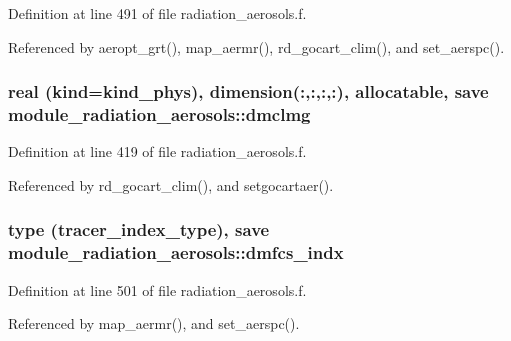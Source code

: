 Definition at line 491 of file radiation\+\_\+aerosols.\+f.



Referenced by aeropt\+\_\+grt(), map\+\_\+aermr(), rd\+\_\+gocart\+\_\+clim(), and set\+\_\+aerspc().

\subsubsection[{\texorpdfstring{dmclmg}{dmclmg}}]{\setlength{\rightskip}{0pt plus 5cm}real (kind=kind\+\_\+phys), dimension(\+:,\+:,\+:,\+:), allocatable, save module\+\_\+radiation\+\_\+aerosols\+::dmclmg\hspace{0.3cm}{\ttfamily [private]}}\hypertarget{namespacemodule__radiation__aerosols_a123d552c7f98f7371565f4e2017efd45}{}\label{namespacemodule__radiation__aerosols_a123d552c7f98f7371565f4e2017efd45}


Definition at line 419 of file radiation\+\_\+aerosols.\+f.



Referenced by rd\+\_\+gocart\+\_\+clim(), and setgocartaer().

\subsubsection[{\texorpdfstring{dmfcs\+\_\+indx}{dmfcs_indx}}]{\setlength{\rightskip}{0pt plus 5cm}type ({\bf tracer\+\_\+index\+\_\+type}), save module\+\_\+radiation\+\_\+aerosols\+::dmfcs\+\_\+indx\hspace{0.3cm}{\ttfamily [private]}}\hypertarget{namespacemodule__radiation__aerosols_ad6c4782fbaae13df20891197b67568ec}{}\label{namespacemodule__radiation__aerosols_ad6c4782fbaae13df20891197b67568ec}


Definition at line 501 of file radiation\+\_\+aerosols.\+f.



Referenced by map\+\_\+aermr(), and set\+\_\+aerspc().

